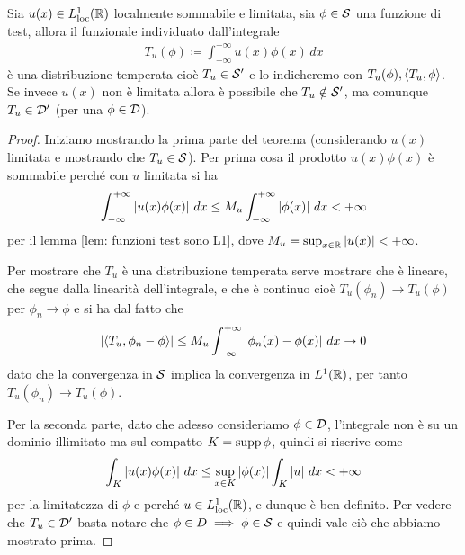 \begin{theorem}[  ] \label{thm: distribuzione associata a una funzione limitata localmente sommabile}
  Sia $ u(x) \in L_{\text{loc}}^1(\R) $ localmente sommabile e limitata, sia $ \phi \in \S $ una funzione di test, allora il funzionale individuato 
  dall'integrale 
  \begin{align}
    T_u(\phi) \coloneq \int_{-\infty}^{+\infty} u(x) \phi (x) \, dx \label{eq: T_u}
  \end{align}
  è una distribuzione temperata cioè $ T_u \in \S' $ e lo indicheremo con $ T_u(\phi), \sc{T_u, \phi} $. Se invece $ u(x) $ non è limitata allora 
  è possibile che $ T_u \notin \S' $, ma comunque $ T_u \in \D' $ (per una $ \phi \in \D $).
\end{theorem}
\begin{proof}
  Iniziamo mostrando la prima parte del teorema (considerando $ u(x) $ limitata e mostrando che $ T_u \in \S $).
  Per prima cosa il prodotto $ u(x)\phi(x) $ è sommabile perché con $ u $ limitata si ha
  \begin{align}
    \int_{-\infty}^{+\infty} \abs{u(x) \phi(x)} \,dx \leq M_u \int_{-\infty}^{+\infty} \abs{\phi(x)} \,dx < +\infty
  \end{align}
  per il lemma \ref{lem: funzioni test sono L1}, dove $ M_u = \sup_{x \in \R} \abs{u(x)} < +\infty $.

  Per mostrare che $ T_u $ è una distribuzione temperata serve mostrare che è lineare, 
  che segue dalla linearità dell'integrale, e che è continuo cioè $ T_u(\phi_n) \to T_u(\phi) $ per $ \phi_n \to \phi $ e si ha dal fatto che 
  \begin{align}
    \abs{\sc{T_u ,\phi_n - \phi}} \leq M_u \int_{-\infty}^{+\infty} \abs{\phi_n(x) - \phi(x)} \,dx \to 0
  \end{align}
  dato che la convergenza in $ \S $ implica la convergenza in $ L^1(\R) $, per tanto $ T_u (\phi_n) \to T_u(\phi) $. 
  
  Per la seconda parte, dato che adesso consideriamo $ \phi \in \D $, l'integrale non è su un dominio illimitato ma sul compatto $ K = \supp \phi $, 
  quindi si riscrive come 
  \begin{align}
    \int_K \abs{u(x) \phi(x)} \,dx \leq \sup_{x \in K} \abs{\phi(x)} \int_K \abs{u} \,dx < +\infty
  \end{align}
  per la limitatezza di $ \phi $ e perché $ u \in L^1_{\text{loc}}(\R) $, e dunque è ben definito. Per vedere che $ T_u \in \D' $ basta notare che 
  $ \phi \in D \implies \phi \in \S $ e quindi vale ciò che abbiamo mostrato prima.
\end{proof}


